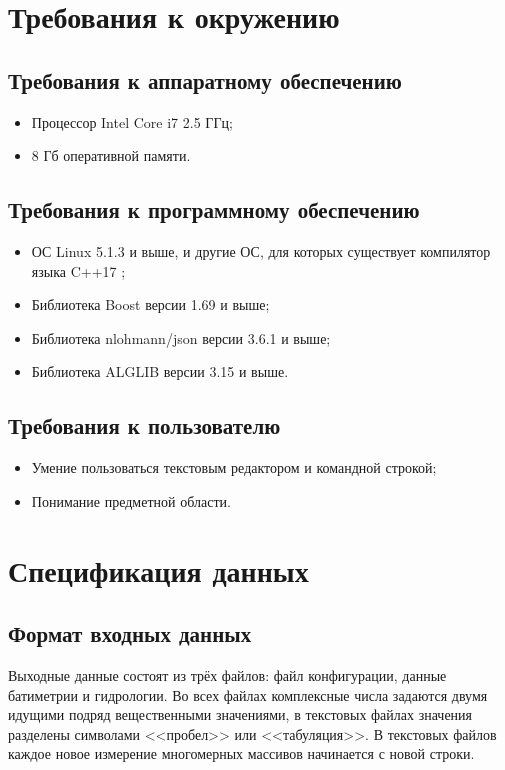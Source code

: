 \documentclass{fefu}
\begin{document}
    \section{Требования к окружению}
        \subsection{Требования к аппаратному обеспечению}
            \begin{itemize}
                \item Процессор Intel Core i7 2.5 ГГц;
                \item 8 Гб оперативной памяти.
            \end{itemize}
        \subsection{Требования к программному обеспечению}
            \begin{itemize}
                \item ОС Linux 5.1.3 и выше, и другие ОС, для которых существует компилятор языка C++17 \cite{c++};
                \item Библиотека Boost \cite{boost} версии 1.69 и выше;
                \item Библиотека nlohmann/json \cite{njson} версии 3.6.1 и выше;
                \item Библиотека ALGLIB версии 3.15 \cite{alglib} и выше. 
            \end{itemize}
        \subsection{Требования к пользователю}
            \begin{itemize}
                \item Умение пользоваться текстовым редактором и командной строкой;
                \item Понимание предметной области.
            \end{itemize}
    \section{Спецификация данных}    
        \subsection{Формат входных данных}
            \par Выходные данные состоят из трёх файлов: файл конфигурации, данные батиметрии и гидрологии. Во всех файлах комплексные числа задаются двумя идущими подряд вещественными значениями, в текстовых файлах значения разделены символами <<пробел>> или <<табуляция>>. В текстовых файлов каждое новое измерение многомерных массивов начинается с новой строки.
\end{document}
